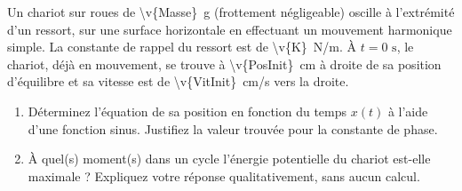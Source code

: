 
Un chariot sur roues de \qty{\v{Masse}}{g} (frottement négligeable) oscille à l’extrémité d’un ressort, sur une surface horizontale en effectuant un mouvement harmonique simple. La constante de rappel du ressort est de \qty{\v{K}}{N/m}. À $t = 0\text{ s}$, le chariot, déjà en mouvement, se trouve à \qty{\v{PosInit}}{cm} à droite de sa position d’équilibre et sa vitesse est de \qty{\v{VitInit}}{cm/s} vers la droite.

\begin{enumerate}[label=\alph*)]
    \item Déterminez l’équation de sa position en fonction du temps $x(t)$ à l’aide d’une fonction sinus. Justifiez la valeur trouvée pour la constante de phase.
    \item À quel(s) moment(s) dans un cycle l’énergie potentielle du chariot est-elle maximale ? Expliquez votre réponse qualitativement, sans aucun calcul.
\end{enumerate}